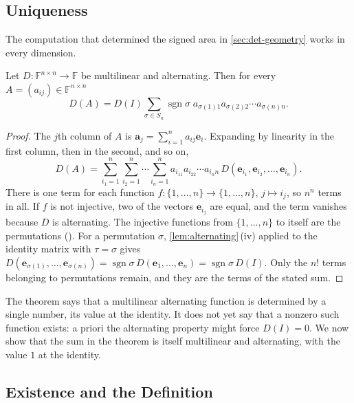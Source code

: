 \subsection{Uniqueness}

The computation that determined the signed area in \cref{sec:det-geometry} works in every dimension.

\begin{theorem}
\label{thm:det-uniqueness}
Let $D\colon\mathbb F^{n\times n}\to\mathbb F$ be multilinear and alternating. Then for every $A=(a_{ij})\in\mathbb F^{n\times n}$
\[
D(A)=D(I)\sum_{\sigma\in S_n}\operatorname{sgn}\sigma\;a_{\sigma(1)1}a_{\sigma(2)2}\cdots a_{\sigma(n)n} .
\]
\end{theorem}

\begin{proof}
The $j$th column of $A$ is $\mathbf a_j=\sum_{i=1}^na_{ij}\mathbf e_i$. Expanding by linearity in the first column, then in the second, and so on,
\[
D(A)=\sum_{i_1=1}^n\sum_{i_2=1}^n\cdots\sum_{i_n=1}^na_{i_11}a_{i_22}\cdots a_{i_nn}\,D(\mathbf e_{i_1},\mathbf e_{i_2},\ldots,\mathbf e_{i_n}).
\]
There is one term for each function $f\colon\{1,\ldots,n\}\to\{1,\ldots,n\}$, $j\mapsto i_j$, so $n^n$ terms in all. If $f$ is not injective, two of the vectors $\mathbf e_{i_j}$ are equal, and the term vanishes because $D$ is alternating. The injective functions from $\{1,\ldots,n\}$ to itself are the permutations (). For a permutation $\sigma$, \cref{lem:alternating}\,(iv) applied to the identity matrix with $\tau=\sigma$ gives $D(\mathbf e_{\sigma(1)},\ldots,\mathbf e_{\sigma(n)})=\operatorname{sgn}\sigma\,D(\mathbf e_1,\ldots,\mathbf e_n)=\operatorname{sgn}\sigma\,D(I)$. Only the $n!$ terms belonging to permutations remain, and they are the terms of the stated sum.
\end{proof}

The theorem says that a multilinear alternating function is determined by a single number, its value at the identity. It does not yet say that a nonzero such function exists: a priori the alternating property might force $D(I)=0$. We now show that the sum in the theorem is itself multilinear and alternating, with the value $1$ at the identity.

\subsection{Existence and the Definition}

